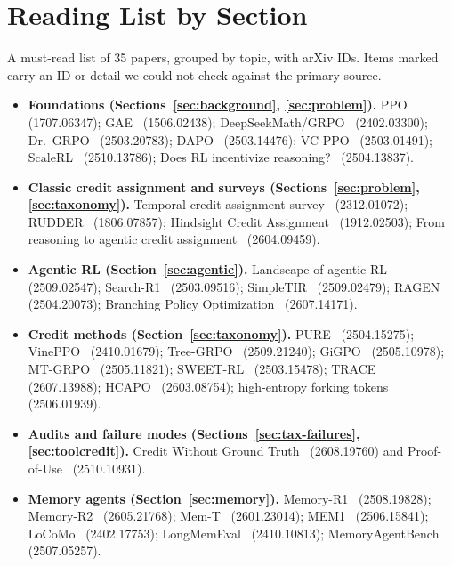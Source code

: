 \section{Reading List by Section}\label{app:reading}
\normalfont\raggedright

A must-read list of 35 papers, grouped by topic, with arXiv IDs. Items marked \unverified{} carry an ID or detail we could not check against the primary source.

\begin{itemize}[leftmargin=*]
  \item \textbf{Foundations (Sections~\ref{sec:background}, \ref{sec:problem}).} PPO~\citep{schulman2017proximal} (1707.06347); GAE~\citep{schulman2015high} (1506.02438); DeepSeekMath/GRPO~\citep{shao2024deepseekmath} (2402.03300); Dr.~GRPO~\citep{liu2025understanding} (2503.20783); DAPO~\citep{yu2025dapo} (2503.14476); VC-PPO~\citep{yuan2025whats} (2503.01491); ScaleRL~\citep{khatri2025art} (2510.13786); Does RL incentivize reasoning?~\citep{yue2025does} (2504.13837).
  \item \textbf{Classic credit assignment and surveys (Sections~\ref{sec:problem}, \ref{sec:taxonomy}).} Temporal credit assignment survey~\citep{pignatelli2024survey} (2312.01072); RUDDER~\citep{arjonamedina2019rudder} (1806.07857); Hindsight Credit Assignment~\citep{harutyunyan2019hindsight} (1912.02503); From reasoning to agentic credit assignment~\citep{zhang2026from} (2604.09459).
  \item \textbf{Agentic RL (Section~\ref{sec:agentic}).} Landscape of agentic RL~\citep{zhang2025landscape} (2509.02547); Search-R1~\citep{jin2025search} (2503.09516); SimpleTIR~\citep{xue2025simpletir} (2509.02479); RAGEN~\citep{wang2025ragen} (2504.20073); Branching Policy Optimization~\citep{bpo2026branching} (2607.14171).
  \item \textbf{Credit methods (Section~\ref{sec:taxonomy}).} PURE~\citep{cheng2025stop} (2504.15275); VinePPO~\citep{kazemnejad2024vineppo} (2410.01679); Tree-GRPO~\citep{ji2025tree} (2509.21240); GiGPO~\citep{feng2025group} (2505.10978); MT-GRPO~\citep{wei2025reinforcing} (2505.11821); SWEET-RL~\citep{zhou2025sweet} (2503.15478); TRACE~\citep{trace2026turn} (2607.13988); HCAPO~\citep{tan2026hindsight} (2603.08754); high-entropy forking tokens~\citep{wang2025beyond} (2506.01939).
  \item \textbf{Audits and failure modes (Sections~\ref{sec:tax-failures}, \ref{sec:toolcredit}).} Credit Without Ground Truth~\citep{zhang2026credit} (2608.19760) and Proof-of-Use~\citep{proofofuse2025proof} (2510.10931).
  \item \textbf{Memory agents (Section~\ref{sec:memory}).} Memory-R1~\citep{yan2025memory} (2508.19828); Memory-R2~\citep{yan2026memory} (2605.21768); Mem-T~\citep{memt2026mem} (2601.23014); MEM1~\citep{zhou2025mem1} (2506.15841)\unverified; LoCoMo~\citep{maharana2024evaluating} (2402.17753); LongMemEval~\citep{wu2024longmemeval} (2410.10813); MemoryAgentBench~\citep{hu2025evaluating} (2507.05257).
\end{itemize}

